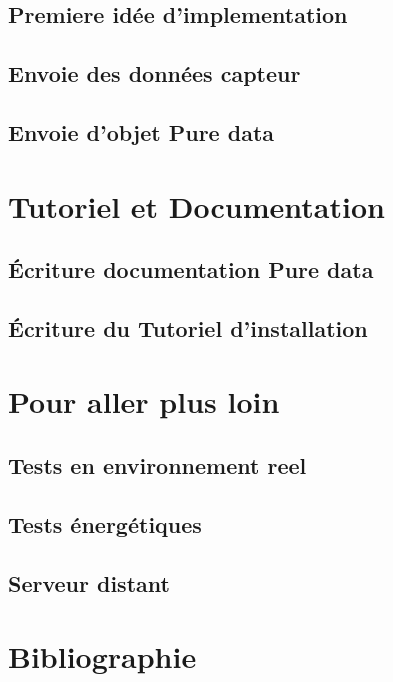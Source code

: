 \documentclass[a4paper, titlepage, oneside, 12pt]{article}%
\begin{document}
\subsection{Premiere idée d'implementation}

\subsection{Envoie des données capteur}

\subsection{Envoie d'objet Pure data}

\newpage
\section{Tutoriel et Documentation}
\subsection{Écriture documentation Pure data}
\subsection{Écriture du Tutoriel d'installation}

\newpage
\section{Pour aller plus loin}
\subsection{Tests en environnement reel}
\subsection{Tests énergétiques}
\subsection{Serveur distant}

\newpage
\section{Bibliographie}
\nocite{*}


\end{document}
